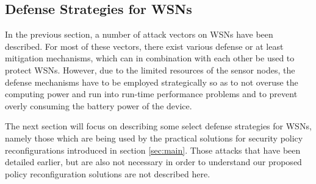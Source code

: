 \documentclass[12pt,a4paper,twoside]{report}
\begin{document}
\subsection{Defense Strategies for WSNs}
In the previous section, a number of attack vectors on WSNs have been described. For most of these vectors, there exist various defense or at least mitigation mechanisms, which can in combination with each other be used to protect WSNs. However, due to the limited resources of the sensor nodes, the defense mechanisms have to be employed strategically so as to not overuse the computing power and run into run-time performance problems and to prevent overly consuming the battery power of the device.\par
The next section will focus on describing some select defense strategies for WSNs, namely those which are being used by the practical solutions for security policy reconfigurations introduced in section \ref{sec:main}. Those attacks that have been detailed earlier, but are also not necessary in order to understand our proposed policy reconfiguration solutions are not described here.
\end{document}
